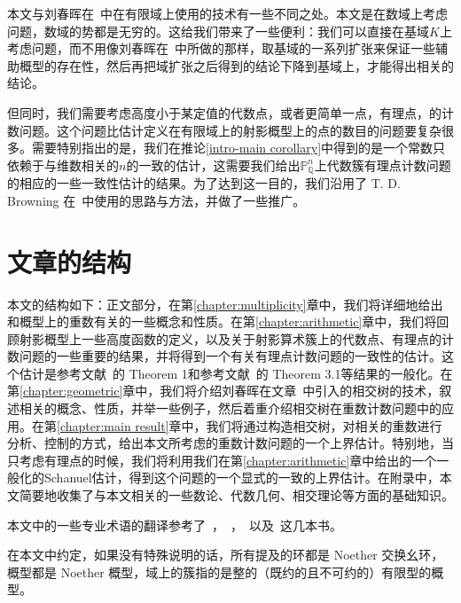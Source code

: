 
本文与刘春晖在~中在有限域上使用的技术有一些不同之处。本文是在数域上考虑问题，数域的势都是无穷的。这给我们带来了一些便利：我们可以直接在基域$K$上考虑问题，而不用像刘春晖在~中所做的那样，取基域的一系列扩张来保证一些辅助概型的存在性，然后再把域扩张之后得到的结论下降到基域上，才能得出相关的结论。

但同时，我们需要考虑高度小于某定值的代数点，或者更简单一点，有理点，的计数问题。这个问题比估计定义在有限域上的射影概型上的点的数目的问题要复杂很多。需要特别指出的是，我们在推论\ref{intro-main corollary}中得到的是一个常数只依赖于与维数相关的$n$的一致的估计，这需要我们给出$\mathbb{P}_{\mathbb{Q}}^n$上代数簇有理点计数问题的相应的一些一致性估计的结果。为了达到这一目的，我们沿用了 T. D. Browning 在~中使用的思路与方法，并做了一些推广。

\section{文章的结构}

本文的结构如下：正文部分，在第\ref{chapter:multiplicity}章中，我们将详细地给出和概型上的重数有关的一些概念和性质。在第\ref{chapter:arithmetic}章中，我们将回顾射影概型上一些高度函数的定义，以及关于射影算术簇上的代数点、有理点的计数问题的一些重要的结果，并将得到一个有关有理点计数问题的一致性的估计。这个估计是参考文献~的 Theorem 1和参考文献~的 Theorem 3.1等结果的一般化。在第\ref{chapter:geometric}章中，我们将介绍刘春晖在文章~中引入的相交树的技术，叙述相关的概念、性质，并举一些例子，然后着重介绍相交树在重数计数问题中的应用。在第\ref{chapter:main result}章中，我们将通过构造相交树，对相关的重数进行分析、控制的方式，给出本文所考虑的重数计数问题的一个上界估计。特别地，当只考虑有理点的时候，我们将利用我们在第\ref{chapter:arithmetic}章中给出的一个一般化的Schanuel估计，得到这个问题的一个显式的一致的上界估计。在附录中，本文简要地收集了与本文相关的一些数论、代数几何、相交理论等方面的基础知识。


本文中的一些专业术语的翻译参考了~，~，~以及~这几本书。

在本文中约定，如果没有特殊说明的话，所有提及的环都是 Noether 交换幺环，概型都是 Noether 概型，域上的簇指的是整的（既约的且不可约的）有限型的概型。
